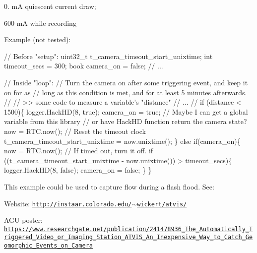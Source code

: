 \begin{DoxyItemize}
\item 0. mA quiescent current draw;
\item 600 mA while recording
\end{DoxyItemize}

Example (not tested)\+:


\begin{DoxyCode}
\textcolor{comment}{// Before "setup":}
uint32\_t t\_camera\_timeout\_start\_unixtime;
\textcolor{keywordtype}{int} timeout\_secs = 300;
book camera\_on = \textcolor{keyword}{false};
\textcolor{comment}{// ...}

\textcolor{comment}{// Inside "loop":}
\textcolor{comment}{// Turn the camera on after some triggering event, and keep it on for as }
\textcolor{comment}{// long as this condition is met, and for at least 5 minutes afterwards.}
\textcolor{comment}{// }
\textcolor{comment}{// >> some code to measure a variable's "distance"}
\textcolor{comment}{// ...}
\textcolor{comment}{// }
\textcolor{keywordflow}{if} (distance < 1500)\{
  logger.HackHD(8, \textcolor{keyword}{true});
  camera\_on = \textcolor{keyword}{true}; \textcolor{comment}{// Maybe I can get a global variable from this library}
                    \textcolor{comment}{// or have HackHD function return the camera state?}
  now = RTC.now();
  \textcolor{comment}{// Reset the timeout clock}
  t\_camera\_timeout\_start\_unixtime = now.unixtime(); 
\}
\textcolor{keywordflow}{else} \textcolor{keywordflow}{if}(camera\_on)\{
  now = RTC.now();
  \textcolor{comment}{// If timed out, turn it off.}
  \textcolor{keywordflow}{if} ((t\_camera\_timeout\_start\_unixtime - now.unixtime()) > timeout\_secs)\{
    logger.HackHD(8, \textcolor{keyword}{false});
    camera\_on = \textcolor{keyword}{false};
  \}
\}
\end{DoxyCode}


This example could be used to capture flow during a flash flood. See\+:
\begin{DoxyItemize}
\item Website\+: \href{http://instaar.colorado.edu/~wickert/atvis/}{\tt http\+://instaar.\+colorado.\+edu/$\sim$wickert/atvis/}
\item A\+GU poster\+: \href{https://www.researchgate.net/publication/241478936_The_Automatically_Triggered_Video_or_Imaging_Station_ATVIS_An_Inexpensive_Way_to_Catch_Geomorphic_Events_on_Camera}{\tt https\+://www.\+researchgate.\+net/publication/241478936\+\_\+\+The\+\_\+\+Automatically\+\_\+\+Triggered\+\_\+\+Video\+\_\+or\+\_\+\+Imaging\+\_\+\+Station\+\_\+\+A\+T\+V\+I\+S\+\_\+\+An\+\_\+\+Inexpensive\+\_\+\+Way\+\_\+to\+\_\+\+Catch\+\_\+\+Geomorphic\+\_\+\+Events\+\_\+on\+\_\+\+Camera}
\end{DoxyItemize}
